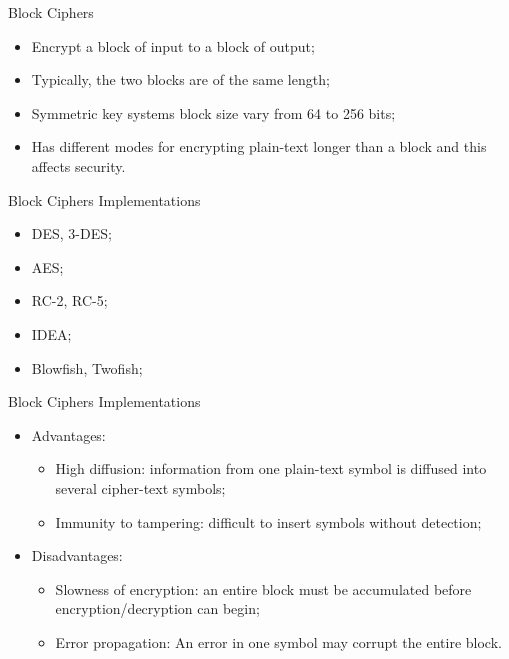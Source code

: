 \documentclass[12pt]{beamer}
\begin{document}
\begin{frame}{Block Ciphers}
\begin{itemize}
\item Encrypt a block of input to a block of output;\pause
\item Typically, the two blocks are of the same length;\pause
\item Symmetric key systems block size vary from 64 to 256 bits;\pause
\item Has different modes for encrypting plain-text longer than a block and this affects security.
\end{itemize}
\end{frame}

\begin{frame}{Block Ciphers Implementations}
\begin{itemize}
\item DES, 3-DES;\pause
\item AES;\pause
\item RC-2, RC-5;\pause
\item IDEA;\pause
\item Blowfish, Twofish;\pause
\end{itemize}
\end{frame}

\begin{frame}{Block Ciphers Implementations}
\begin{itemize}
\item Advantages:\pause
\begin{itemize}
\item High diffusion: information from one plain-text symbol is diffused into several cipher-text symbols;\pause
\item Immunity to tampering: difficult to insert symbols without detection;\pause
\end{itemize}
\item Disadvantages:\pause
\begin{itemize}
\item Slowness of encryption: an entire block must be accumulated before encryption/decryption can begin;\pause
\item Error propagation: An error in one symbol may corrupt the entire block.
\end{itemize}
\end{itemize}
\end{frame}
\end{document}
